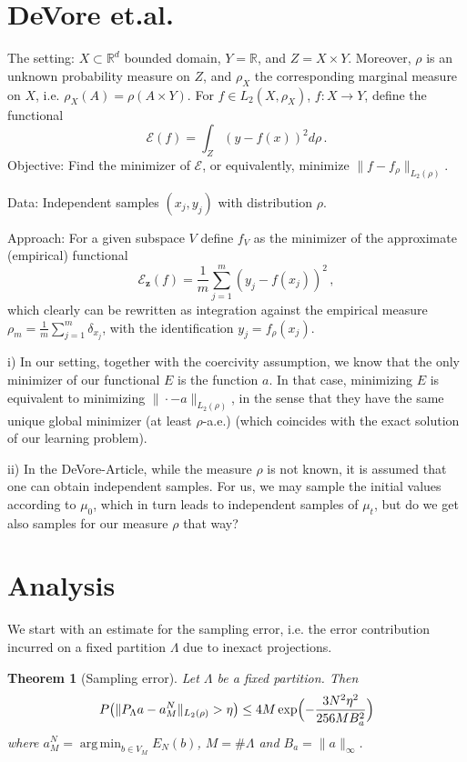 \documentclass[A4paper,11pt]{article}
\newtheorem{theorem}{Theorem}[section]
\theoremstyle{definition}
\newcommand{\R}{\mathbb{R}}
\DeclareMathOperator{\argmin}{arg\,min}
\begin{document}
\section{DeVore et.al.}

The setting: $X\subset\R^d$ bounded domain, $Y=\R$, and $Z=X\times Y$. Moreover, $\rho$ is an unknown probability measure on $Z$, and $\rho_X$ the corresponding marginal measure on $X$, i.e. $\rho_X(A)=\rho(A\times Y)$. For $f\in L_2(X,\rho_X)$, $f:X\rightarrow Y$, define the functional
\[
	\mathcal{E}(f)=\int_Z (y-f(x))^2 d\rho\,.
\]
Objective: Find the minimizer of $\mathcal{E}$, or equivalently, minimize $\|f-f_\rho\|_{L_2(\rho)}$.

Data: Independent samples $(x_j,y_j)$ with distribution $\rho$.

Approach: For a given subspace $V$ define $f_V$ as the minimizer of the approximate (empirical) functional
\[
	\mathcal{E}_{\mathbf{z}}(f)=\frac{1}{m}\sum_{j=1}^m(y_j-f(x_j))^2\,,
\]
which clearly can be rewritten as integration against the empirical measure
$\rho_m=\frac{1}{m}\sum_{j=1}^m\delta_{x_j}$, with the identification $y_j=f_\rho(x_j)$.

\vspace{1cm}

i) In our setting, together with the coercivity assumption, we know that the only minimizer of our functional $E$ is the function $a$. In that case, minimizing $E$ is equivalent to minimizing $\|\cdot-a\|_{L_2(\rho)}$, in the sense that they have the same unique global minimizer (at least $\rho$-a.e.) (which coincides with the exact solution of our learning problem).

ii) In the DeVore-Article, while the measure $\rho$ is not known, it is assumed that one can obtain independent samples. For us, we may sample the initial values according to $\mu_0$, which in turn leads to independent samples of $\mu_t$, but do we get also samples for our measure $\rho$ that way?

\pagebreak

\section{Analysis}

We start with an estimate for the sampling error, i.e. the error contribution incurred on a fixed partition $\Lambda$ due to inexact projections.

\begin{theorem}[Sampling error]
	Let $\Lambda$ be a fixed partition. Then
	\[
		P\bigl(\|P_\Lambda a-a^N_M\|_{L_2(\rho)}>\eta\bigr)
			\leq 4M\exp\Bigl(-\frac{3N^2\eta^2}{256MB_a^2}\Bigr)
	\]
	where $a^N_M=\argmin_{b\in V_M}E_N(b)$, $M=\#\Lambda$ and $B_a=\|a\|_\infty$.
\end{theorem}
\end{document}
